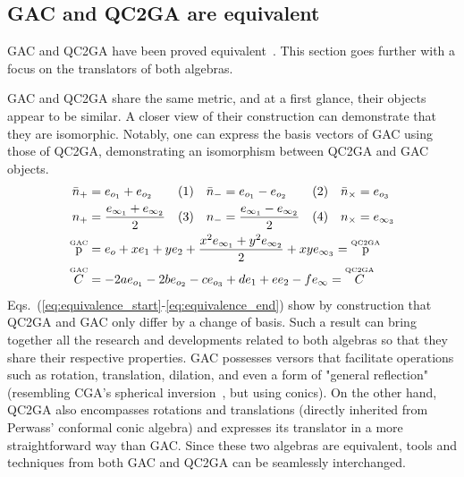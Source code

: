 \documentclass{birkjour}
\begin{document}

\subsection{GAC and QC2GA are equivalent}
\label{sec:equivalence}
GAC and QC2GA have been proved equivalent~\cite{chomicki_intersection_2023}. This section goes further with a focus on the translators of both algebras.

GAC and QC2GA share the same metric, and at a first glance, their objects appear to be similar. A closer view of their construction can demonstrate that they are isomorphic. Notably, one can express the basis vectors of GAC using those of QC2GA, demonstrating an isomorphism between QC2GA and GAC objects. 
\begin{align}\displaystyle\label{eq:equivalence_start}
\bar n_{+} &= e_{o_1} + e_{o_2} && \forcenumbering &
\bar n_{-} &= e_{o_1} - e_{o_2} && \forcenumbering &
\bar n_{\times} &= e_{o_3}\\
n_{+} &= \frac{e_{\infty_1} + e_{\infty_2}}{2} && \forcenumbering &
n_{-} &= \frac{e_{\infty_1} - e_{\infty_2}}{2} && \forcenumbering &
n_{\times} &= e_{\infty_3}\\
            \gacobject{\mathrm{p}} &= e_o + xe_1 + ye_2 + \frac{x^2 e_{\infty_1} + y^2 e_{\infty_2}}{2}+xye_{\infty_3}
            = \qcgaobject{\mathrm{p}} \span\span\span\span\span\span\span\span\\
            \gacobject{C} &= - 2a e_{o_1} -  2b e_{o_2}- c e_{o_3} + d e_1 + e e_2 - f e_\infty
            = \qcgaobject{C} \span\span\span\span\span\span\span\span
            \label{eq:equivalence_end}
\end{align}
Eqs.~(\ref{eq:equivalence_start}-\ref{eq:equivalence_end}) show by construction that QC2GA and GAC only differ by a change of basis.
Such a result can bring together all the research and developments related to both algebras so that they share their respective properties. GAC possesses versors that facilitate operations such as rotation, translation, dilation, and even a form of "general reflection" (resembling CGA's spherical inversion~\cite{perwass_geometric_2009}, but using conics). On the other hand, QC2GA also encompasses rotations and translations (directly inherited from Perwass' conformal conic algebra) and expresses its translator in a more straightforward way than GAC. Since these two algebras are equivalent, tools and techniques from both GAC and QC2GA can be seamlessly interchanged. 
\end{document}
